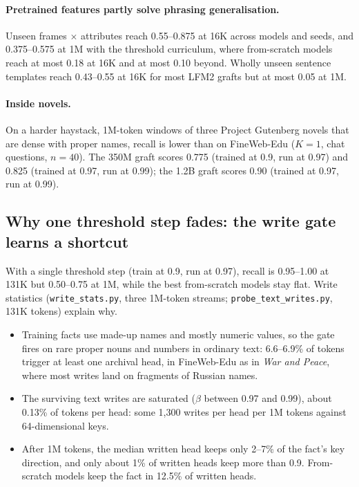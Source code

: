\documentclass[11pt]{article}
\begin{document}
\paragraph{Pretrained features partly solve phrasing generalisation.} Unseen frames $\times$ attributes reach 0.55--0.875 at 16K across models and seeds, and 0.375--0.575 at 1M with the threshold curriculum, where from-scratch models reach at most 0.18 at 16K and at most 0.10 beyond. Wholly unseen sentence templates reach 0.43--0.55 at 16K for most LFM2 grafts but at most 0.05 at 1M.

\paragraph{Inside novels.} On a harder haystack, 1M-token windows of three Project Gutenberg novels \citep{gutenberg} that are dense with proper names, recall is lower than on FineWeb-Edu ($K = 1$, chat questions, $n = 40$). The 350M graft scores 0.775 (trained at 0.9, run at 0.97) and 0.825 (trained at 0.97, run at 0.99); the 1.2B graft scores 0.90 (trained at 0.97, run at 0.99).

\subsection{Why one threshold step fades: the write gate learns a shortcut}
\label{sec:shortcut}
With a single threshold step (train at 0.9, run at 0.97), recall is 0.95--1.00 at 131K but 0.50--0.75 at 1M, while the best from-scratch models stay flat. Write statistics (\texttt{write\_stats.py}, three 1M-token streams; \texttt{probe\_text\_writes.py}, 131K tokens) explain why.
\begin{itemize}
\item Training facts use made-up names and mostly numeric values, so the gate fires on rare proper nouns and numbers in ordinary text: 6.6--6.9\% of tokens trigger at least one archival head, in FineWeb-Edu as in \emph{War and Peace}, where most writes land on fragments of Russian names.
\item The surviving text writes are saturated ($\beta$ between 0.97 and 0.99), about 0.13\% of tokens per head: some 1{,}300 writes per head per 1M tokens against 64-dimensional keys.
\item After 1M tokens, the median written head keeps only 2--7\% of the fact's key direction, and only about 1\% of written heads keep more than 0.9. From-scratch models keep the fact in 12.5\% of written heads.
\end{itemize}
\end{document}
